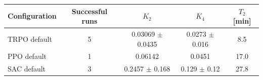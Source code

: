 \begin{tabular}{lcccc}
\toprule
Configuration & Successful runs & $K_2$ & $K_4$ & $T_2$ [min] \\
\midrule
TRPO default & 5 & 0.03069 $\pm$ 0.0435 & 0.0273 $\pm$ 0.016 & 8.5 \\
PPO default & 1 & 0.06142 & 0.0451 & 17.0 \\
SAC default & 3 & 0.2457 $\pm$ 0.168 & 0.129 $\pm$ 0.12 & 27.8 \\
\bottomrule
\end{tabular}
